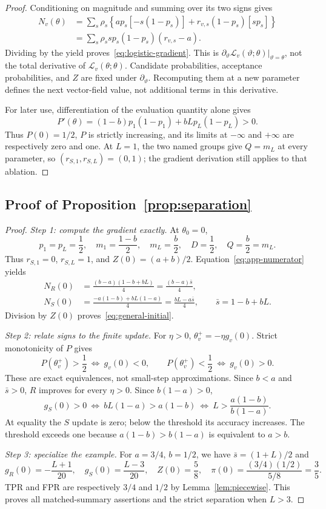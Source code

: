 \begin{proof}
Conditioning on magnitude and summing over its two signs gives
\begin{align}
 N_v(\theta)
 &=\sum_s\rho_s\left\{a p_s[-s(1-p_s)]
            +r_{v,s}(1-p_s)[sp_s]\right\}\nonumber\\
 &=\sum_s\rho_s s p_s(1-p_s)(r_{v,s}-a).
 \label{eq:app-numerator}
\end{align}
Dividing by the yield proves~\eqref{eq:logistic-gradient}. This is
$\partial_\vartheta\mathcal L_v(\vartheta;\theta)|_{\vartheta=\theta}$,
not the total derivative of $\mathcal L_v(\theta;\theta)$. Candidate
probabilities, acceptance probabilities, and $Z$ are fixed under
$\partial_\vartheta$. Recomputing them at a new parameter defines the next
vector-field value, not additional terms in this derivative.

For later use, differentiation of the evaluation quantity alone gives
\[
 P'(\theta)=(1-b)p_1(1-p_1)+bL p_L(1-p_L)>0.
\]
Thus $P(0)=1/2$, $P$ is strictly increasing, and its limits at $-\infty$
and $+\infty$ are respectively zero and one. At $L=1$, the two named
groups give $Q=m_L$ at every parameter, so $(r_{S,1},r_{S,L})=(0,1)$;
the gradient derivation still applies to that ablation.
\end{proof}

\subsection{Proof of Proposition~\ref{prop:separation}}
\begin{proof}
\textit{Step 1: compute the gradient exactly.}
At $\theta_0=0$,
\[
 p_1=p_L=\frac12,\quad m_1=\frac{1-b}{2},\quad m_L=\frac b2,
 \quad D=\frac12,\quad Q=\frac b2=m_L.
\]
Thus $r_{S,1}=0$, $r_{S,L}=1$, and $Z(0)=(a+b)/2$.
Equation~\eqref{eq:app-numerator} yields
\begin{align*}
 N_R(0)&=\frac{(b-a)(1-b+bL)}4=\frac{(b-a)\bar s}{4},\\
 N_S(0)&=\frac{-a(1-b)+bL(1-a)}4=\frac{bL-a\bar s}{4},
 \qquad\bar s=1-b+bL.
\end{align*}
Division by $Z(0)$ proves~\eqref{eq:general-initial}.

\textit{Step 2: relate signs to the finite update.}
For $\eta>0$, $\theta_v^+=-\eta g_v(0)$. Strict monotonicity of $P$ gives
\[
 P(\theta_v^+)>\frac12\ \Longleftrightarrow\ g_v(0)<0,
 \qquad P(\theta_v^+)<\frac12\ \Longleftrightarrow\ g_v(0)>0.
\]
These are exact equivalences, not small-step approximations. Since $b<a$
and $\bar s>0$, $R$ improves for every $\eta>0$. Since $b(1-a)>0$,
\[
 g_S(0)>0\ \Longleftrightarrow\ bL(1-a)>a(1-b)
          \ \Longleftrightarrow\ L>\frac{a(1-b)}{b(1-a)}.
\]
At equality the $S$ update is zero; below the threshold its accuracy
increases. The threshold exceeds one because
$a(1-b)>b(1-a)$ is equivalent to $a>b$.

\textit{Step 3: specialize the example.}
For $a=3/4$, $b=1/2$, we have $\bar s=(1+L)/2$ and
\[
 g_R(0)=-\frac{L+1}{20},\quad g_S(0)=\frac{L-3}{20},\quad
 Z(0)=\frac58,\quad \pi(0)=\frac{(3/4)(1/2)}{5/8}=\frac35.
\]
TPR and FPR are respectively $3/4$ and $1/2$ by Lemma~\ref{lem:piecewise}.
This proves all matched-summary assertions and the strict separation
when $L>3$.
\end{proof}

